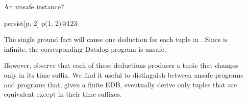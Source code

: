 

\begin{example}
\label{ex:tempsafe}
%
An unsafe \slang instance?
\\
\begin{Dedalus}
persist[p, 2]
p(1, 2)@123;
\end{Dedalus}


The single ground fact will cause one deduction for each tuple in
.  Since  is infinite, the corresponding
Datalog
program is unsafe.  
%
\end{example}

However, observe that each of these deductions produces a tuple that changes
only in its time suffix.  We find it useful to distinguish between unsafe
programs and programs that, given a finite EDB, eventually derive only tuples
that are equivalent except in their time suffixes.




